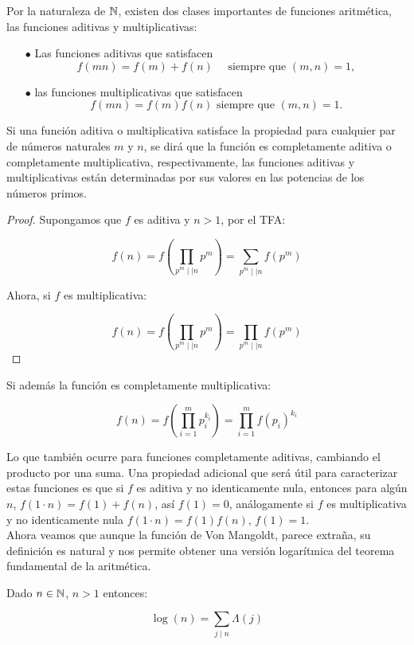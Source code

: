 Por la naturaleza de $\mathbb{N}$, existen dos clases importantes de funciones aritmética, las funciones aditivas y multiplicativas:

\begin{itemize}

\item[$\bullet$] Las funciones aditivas que satisfacen
$$
f(m n)=f(m)+f(n) \quad \text { siempre que }(m, n)=1,
$$


\item[$\bullet$] las funciones multiplicativas que satisfacen
$$
f(m n)=f(m) f(n) \text { siempre que }(m, n)=1 .
$$


\end{itemize}


Si una función aditiva o multiplicativa satisface la  propiedad para cualquier par de números naturales $m$ y $n$, se dirá que la función es completamente aditiva o completamente multiplicativa, respectivamente, las funciones aditivas y multiplicativas están determinadas por sus valores en las potencias de los números primos.\\ 

\begin{proof}
Supongamos que $f$ es aditiva y $n>1$, por el TFA:

$$f(n)=f\left(\prod_{p^m\mid\mid n}p^m\right)=\sum_{p^m\mid \mid n} f(p^{m})$$

Ahora, si $f$ es multiplicativa:

$$f(n)=f\left(\prod_{p^m\mid\mid n}p^m\right)=\prod_{p^m\mid\mid n}f(p^m) $$
\end{proof}

Si además la función es completamente multiplicativa:

$$f(n)=f\left(\prod_{i=1}^{m}p_i^{k_i}\right)=\prod_{i=1}^{m} f(p_i)^{k_i} $$

Lo que también ocurre para funciones completamente aditivas, cambiando el producto por una suma.  Una propiedad adicional que será útil para caracterizar estas funciones es que si $f$ es aditiva y no identicamente nula, entonces para algún $n$, $f(1\cdot  n)=f(1)+f(n)$, así $f(1)=0$, análogamente si $f$ es multiplicativa y no identicamente nula $f(1\cdot n)=f(1)f(n)$, $f(1)=1$.\\

Ahora veamos que aunque la función de Von Mangoldt, parece extraña, su definición es natural y nos permite obtener una versión logarítmica del teorema fundamental de la aritmética.

\begin{theorem}
Dado $n\in \mathbb{N}$, $n>1$ entonces:

$$\log(n)=\sum_{j\mid n}\Lambda(j)$$
\end{theorem}


